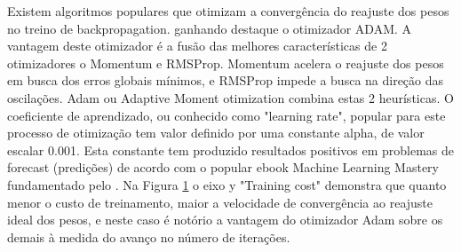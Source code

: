         Existem algoritmos populares que otimizam a convergência do reajuste dos pesos no treino de backpropagation. ganhando destaque o otimizador ADAM. A vantagem deste otimizador é a fusão das melhores características de 2 otimizadores o Momentum e RMSProp. Momentum acelera o reajuste dos pesos em busca dos erros globais mínimos, e RMSProp impede a busca na direção das oscilações.\newline
         Adam ou Adaptive Moment otimization combina estas 2 heurísticas. O coeficiente de aprendizado, ou conhecido como "learning rate", popular para este processo de otimização tem valor definido por uma constante alpha, de valor escalar 0.001.
        Esta constante tem produzido resultados positivos em problemas de forecast (predições) de acordo com o popular ebook Machine Learning Mastery fundamentado pelo . Na Figura \ref{fig:otimizadores} o eixo y "Training cost" demonstra que quanto menor o custo de treinamento, maior a velocidade de convergência ao reajuste ideal dos pesos, e neste caso é notório a vantagem do otimizador Adam sobre os demais à medida do avanço no número de iterações.
        
        \begin{figure}[H]
        	\label{fig:otimizadores}
        \end{figure}
            
